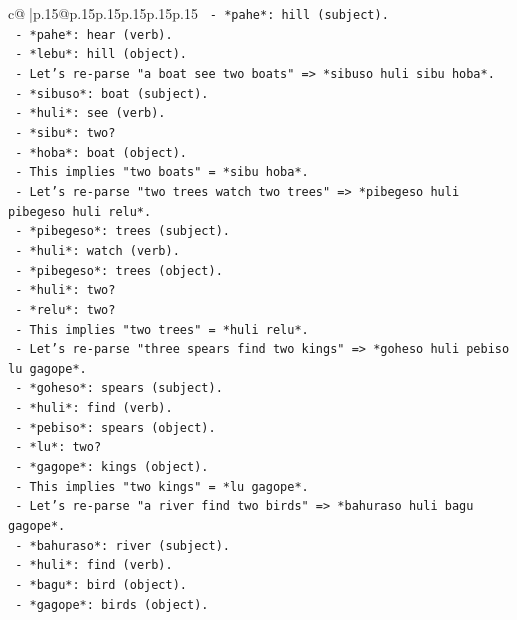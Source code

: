 \documentclass{article}
\begin{document}
{\begin{supertabular}{c@{$\;$}|p{.15\linewidth}@{}p{.15\linewidth}p{.15\linewidth}p{.15\linewidth}p{.15\linewidth}p{.15\linewidth}}
{{{\texttt{      {-} *pahe*: hill (subject).} \\
\texttt{      {-} *pahe*: hear (verb).} \\
\texttt{      {-} *lebu*: hill (object).} \\
\texttt{    {-} Let's re{-}parse "a boat see two boats" => *sibuso huli sibu hoba*.} \\
\texttt{      {-} *sibuso*: boat (subject).} \\
\texttt{      {-} *huli*: see (verb).} \\
\texttt{      {-} *sibu*: two?} \\
\texttt{      {-} *hoba*: boat (object).} \\
\texttt{      {-} This implies "two boats" = *sibu hoba*.} \\
\texttt{    {-} Let's re{-}parse "two trees watch two trees" => *pibegeso huli pibegeso huli relu*.} \\
\texttt{      {-} *pibegeso*: trees (subject).} \\
\texttt{      {-} *huli*: watch (verb).} \\
\texttt{      {-} *pibegeso*: trees (object).} \\
\texttt{      {-} *huli*: two?} \\
\texttt{      {-} *relu*: two?} \\
\texttt{      {-} This implies "two trees" = *huli relu*.} \\
\texttt{    {-} Let's re{-}parse "three spears find two kings" => *goheso huli pebiso lu gagope*.} \\
\texttt{      {-} *goheso*: spears (subject).} \\
\texttt{      {-} *huli*: find (verb).} \\
\texttt{      {-} *pebiso*: spears (object).} \\
\texttt{      {-} *lu*: two?} \\
\texttt{      {-} *gagope*: kings (object).} \\
\texttt{      {-} This implies "two kings" = *lu gagope*.} \\
\texttt{    {-} Let's re{-}parse "a river find two birds" => *bahuraso huli bagu gagope*.} \\
\texttt{      {-} *bahuraso*: river (subject).} \\
\texttt{      {-} *huli*: find (verb).} \\
\texttt{      {-} *bagu*: bird (object).} \\
\texttt{      {-} *gagope*: birds (object).} \\
}}}
\end{supertabular}}
\end{document}
